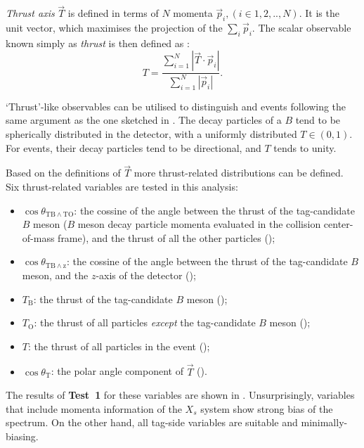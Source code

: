 \textit{Thrust axis} $\vec{T}$ is defined in terms of $N$ momenta $\vec{p}_i,(i\in{1,2,..,N})$.
It is the unit vector, which maximises the projection of the $\sum_i\vec{p}_i$.
The scalar observable known simply as \textit{thrust} is then defined as \cite{BaBar:2014omp}:
\begin{equation}\label{eq:thrust}
    T = \frac{\sum^N_{i=1}|\vec{T}\cdot\vec{p}_i|}{\sum^N_{i=1}|\vec{p}_i|}.
\end{equation}

`Thrust'-like observables can be utilised to distinguish \epem\ra\qqbar and \BtoXsgamma events following the same argument as the one sketched in .
The decay particles of a $B$ tend to be spherically distributed in the detector, with a uniformly distributed $T\in(0,1)$.
For \qqbar events, their decay particles tend to be directional, and $T$ tends to unity.

Based on the definitions of $\vec{T}$ more thrust-related distributions can be defined.
Six thrust-related variables are tested in this analysis:
\begin{itemize}
    \item $\cos\theta_{\mathrm{TB}\wedge\mathrm{TO}}$: the cossine of the angle between the thrust of the tag-candidate $B$ meson ($B$ meson decay particle momenta evaluated in the collision center-of-mass frame),
    and the thrust of all the other particles ();
    \item $\cos\theta_{\mathrm{TB}\wedge\mathrm{z}}$: the cossine of the angle between the thrust of the tag-candidate $B$ meson,
    and the $z$-axis of the detector ();
    \item $T_{\mathrm{B}}$: the thrust of the tag-candidate $B$ meson ();
    \item $T_{\mathrm{O}}$: the thrust of all particles \textit{except} the tag-candidate $B$ meson ();
    \item $T$: the thrust of all particles in the event ();
    \item $\cos\theta_{\mathrm{T}}$: the polar angle component of $\vec{T}$ ().
\end{itemize}

The results of \textbf{Test~1} for these variables are shown in .
Unsurprisingly, variables that include momenta information of the $X_s$ system show strong bias of the spectrum.
On the other hand, all tag-side variables are suitable and minimally-biasing.

